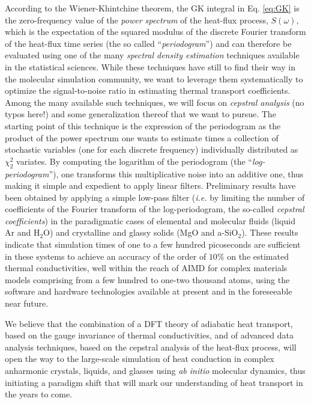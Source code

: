 According to the Wiener-Khintchine theorem,\cite{Wiener1930,Khintchine1934} the GK integral in Eq. \eqref{eq:GK} is the zero-frequency value of the \emph{power spectrum} of the heat-flux process, $S(\omega)$, which is the expectation of the squared modulus of the discrete Fourier transform of the heat-flux time series (the so called ``\emph{periodogram}'') and can therefore be evaluated using one of the many \emph{spectral density estimation} techniques available in the statistical sciences.\cite{Stoica2005} While these techniques have still to find their way in the molecular simulation community, we want to leverage them systematically to optimize the signal-to-noise ratio in estimating thermal transport coefficients. Among the many available such techniques, we will focus on \emph{cepstral analysis}\cite{Childers1977} (no typos here!) and some generalization thereof that we want to pursue. The starting point of this technique is the expression of the periodogram as the product of the power spectrum one wants to estimate times a collection of stochastic variables (one for each discrete frequency) individually distributed as $\chi^2_2$ variates.\cite{Anderson1971,Peligrad2010,Ercole2017} By computing the logarithm of the periodogram (the ``\emph{log-periodogram}''), one transforms this multiplicative noise into an additive one, thus making it simple and expedient to apply linear filters. Preliminary results have been obtained by applying a simple low-pass filter (\emph{i.e.} by limiting the number of coefficients of the Fourier transform of the log-periodogram, the so-called \emph{cepstral coefficients}) in the paradigmatic cases of elemental and molecular fluids (liquid Ar and H$_2$O) and crystalline and glassy solids (MgO and a-SiO$_2$).\cite{Ercole2017} These results indicate that simulation times of one to a few hundred picoseconds are sufficient in these systems to achieve an accuracy of the order of $10\%$ on the estimated thermal conductivities,\cite{Ercole2017} well within the reach of AIMD for complex materials models comprising from a few hundred to one-two thousand atoms, using the software and hardware technologies available at present and in the foreseeable near future.

We believe that the combination of a DFT theory of adiabatic heat transport, based on the gauge invariance of thermal conductivities, and of advanced data analysis techniques, based on the cepstral analysis of the heat-flux process, will open the way to the large-scale simulation of heat conduction in complex anharmonic crystals, liquids, and glasses using {\it ab initio} molecular dynamics, thus initiating a paradigm shift that will mark our understanding of heat transport in the years to come.

